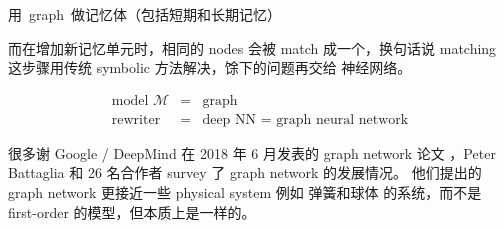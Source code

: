 \documentclass[12pt, orivec]{article}
\newcommand{\cc}[2]{#1}
\newcommand{\cc}[2]{#2}
\begin{document}
\begin{tcolorbox}[ams equation, colback=yellow, colframe=white]
\cc{
\mbox{用 graph 做记忆体（包括短期和长期记忆）}}{
\begin{aligned}
\mbox{Use a \textbf{graph} for memory storage} \\
\mbox{(including long-term and short-term memories)}
\end{aligned}
}
\end{tcolorbox}
\cc{而在增加新记忆单元时，相同的 nodes 会被 match 成一个，换句话说 matching 这步骤用传统 symbolic 方法解决，馀下的问题再交给 神经网络。 
}{
When adding a new memory unit, the same nodes will be matched into one. In other words, the matching step is solved by the traditional symbolic method, and the problem is left to the neural network.}
\begin{eqnarray}
\mbox{model } \mathscr{M} &=& \mbox{graph} \nonumber \\
\mbox{rewriter} &=& \mbox{deep NN = graph neural network}
\end{eqnarray}

\cc{很多谢 Google / DeepMind 在 2018 年 6 月发表的 graph network 论文 \parencite{Battaglia2018}，Peter Battaglia 和 26 名合作者 survey 了 graph network 的发展情况。  他们提出的 graph network 更接近一些 physical system 例如 弹簧和球体 的系统，而不是 first-order 的模型，但本质上是一样的。
}{
Many thanks to the graph network paper \parencite{Battaglia2018} published by Google / DeepMind in June 2018, Peter Battaglia and 26 collaborators surveyed the development of graph network. The graph network they proposed is closer to some physical systems such as springs and spheres, rather than the first-order model, but essentially the same.}
\end{document}
